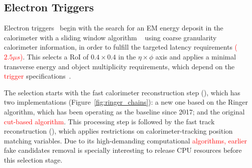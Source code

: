 \subsection{Electron Triggers}\label{ssec:egamma_trigger}


Electron triggers~\cite{aad2020performance} begin with
the search for an EM energy deposit in the calorimeter with a \licalo{} sliding
window algorithm \textcolor{red}{~\cite{Franchino:2730851}} using coarse granularity calorimeter information, in order to
fulfill the targeted latency requirements \textcolor{red}{($2.5\mu s$)}. This selects a RoI of $0.4\times 0.4$
in the $\eta\times\phi$ axis and applies a minimal transverse energy and object
multiplicity requirements, which depend on the \textcolor{red}{trigger}
specifications~\cite{TRIG-2016-01}.
 
The \hlt{} selection starts with the fast calorimeter reconstruction
step (\fastcalo), which has two implementations
(Figure~\ref{fig:ringer_chains}): a new one based on the Ringer algorithm, which
has been operating as the baseline since 2017; and the original \textcolor{red}{cut-based
algorithm}.%
This processing step is followed by the fast track reconstruction
(\fastelectron), which applies restrictions on calorimeter-tracking position
matching variables. Due to its high-demanding computational \textcolor{red}{algorithms, earlier}
 fake candidates removal is specially
interesting to release CPU resources before this selection stage.


